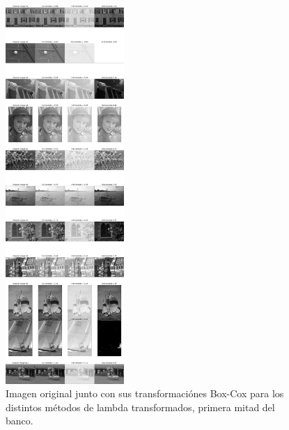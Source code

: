 \begin{figure}
    \centering
    \includegraphics[width=0.4\textwidth]{figuras/img_BCI_all_1.png}
    \caption{Imagen original junto con sus transformaci\'ones Box-Cox para los distintos m\'etodos de lambda transformados, primera mitad del banco.}
\end{figure}

